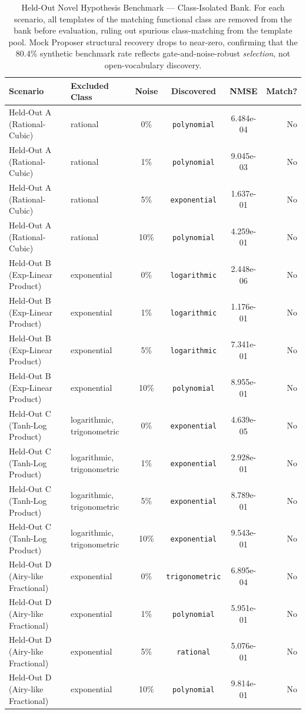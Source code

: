 \begin{table}[H]
\centering\footnotesize
\caption{Held-Out Novel Hypothesis Benchmark — Class-Isolated Bank. For each scenario, all templates of the matching functional class are removed from the bank before evaluation, ruling out spurious class-matching from the template pool. Mock Proposer structural recovery drops to near-zero, confirming that the 80.4\% synthetic benchmark rate reflects gate-and-noise-robust \emph{selection}, not open-vocabulary discovery.}
\label{tab:held_out_results}
\begin{tabularx}{\textwidth}{l l c c c r}
\toprule
\textbf{Scenario} & \textbf{Excluded Class} & \textbf{Noise} & \textbf{Discovered} & \textbf{NMSE} & \textbf{Match?} \\
\midrule
Held-Out A (Rational-Cubic) & rational & 0\% & \texttt{polynomial} & 6.484e-04 & No \\
Held-Out A (Rational-Cubic) & rational & 1\% & \texttt{polynomial} & 9.045e-03 & No \\
Held-Out A (Rational-Cubic) & rational & 5\% & \texttt{exponential} & 1.637e-01 & No \\
Held-Out A (Rational-Cubic) & rational & 10\% & \texttt{polynomial} & 4.259e-01 & No \\
Held-Out B (Exp-Linear Product) & exponential & 0\% & \texttt{logarithmic} & 2.448e-06 & No \\
Held-Out B (Exp-Linear Product) & exponential & 1\% & \texttt{logarithmic} & 1.176e-01 & No \\
Held-Out B (Exp-Linear Product) & exponential & 5\% & \texttt{logarithmic} & 7.341e-01 & No \\
Held-Out B (Exp-Linear Product) & exponential & 10\% & \texttt{polynomial} & 8.955e-01 & No \\
Held-Out C (Tanh-Log Product) & logarithmic, trigonometric & 0\% & \texttt{exponential} & 4.639e-05 & No \\
Held-Out C (Tanh-Log Product) & logarithmic, trigonometric & 1\% & \texttt{exponential} & 2.928e-01 & No \\
Held-Out C (Tanh-Log Product) & logarithmic, trigonometric & 5\% & \texttt{exponential} & 8.789e-01 & No \\
Held-Out C (Tanh-Log Product) & logarithmic, trigonometric & 10\% & \texttt{exponential} & 9.543e-01 & No \\
Held-Out D (Airy-like Fractional) & exponential & 0\% & \texttt{trigonometric} & 6.895e-04 & No \\
Held-Out D (Airy-like Fractional) & exponential & 1\% & \texttt{polynomial} & 5.951e-01 & No \\
Held-Out D (Airy-like Fractional) & exponential & 5\% & \texttt{rational} & 5.076e-01 & No \\
Held-Out D (Airy-like Fractional) & exponential & 10\% & \texttt{polynomial} & 9.814e-01 & No \\
\bottomrule
\end{tabularx}
\end{table}
